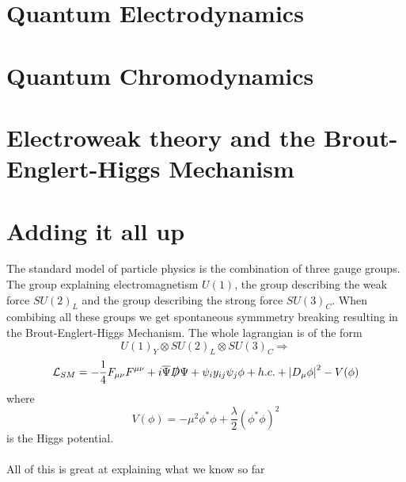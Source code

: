 \documentclass[14pt, a4paper]{book}
\begin{document}
\section{Quantum Electrodynamics}
\section{Quantum Chromodynamics}
\section{Electroweak theory and the Brout-Englert-Higgs Mechanism}
\section{Adding it all up}
The standard model of particle physics is the combination of three gauge groups. The group explaining electromagnetism $U(1)$, the group describing the weak force $SU(2)_L$ and the group describing the strong force $SU(3)_C$. 
When combibing all these groups we get spontaneous symmmetry breaking resulting in the Brout-Englert-Higgs Mechanism. The whole lagrangian is of the form
$$
U(1)_Y\otimes SU(2)_L\otimes SU(3)_C \Rightarrow 
$$
\begin{equation}
    \mathcal{L}_{SM} = -\frac{1}{4}F_{\mu\nu}F^{\mu\nu} + i\overline{\Psi}\slashed{D}\Psi + \psi_iy_{ij}\psi_j\phi + h.c. + \abs{D_\mu\phi}^2 - V(\phi)
\end{equation}
where 
$$
V(\phi)=-\mu^2\phi^*\phi + \frac{\lambda}{2}(\phi^*\phi)^2
$$
is the Higgs potential.\\
\\All of this is great at explaining what we know so far
\end{document}
